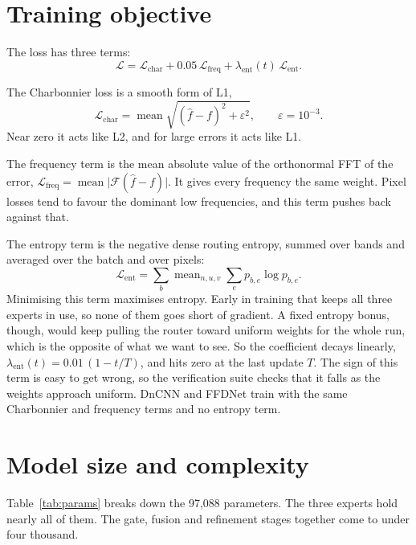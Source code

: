 \documentclass[12pt,a4paper,oneside]{NITR}
\begin{document}
\section{Training objective}\label{sec:loss}

The loss has three terms:
\begin{equation}
	\mathcal{L} = \mathcal{L}_\text{char}
	+ 0.05\,\mathcal{L}_\text{freq}
	+ \lambda_\text{ent}(t)\,\mathcal{L}_\text{ent}.
	\label{eq:loss}
\end{equation}

The Charbonnier loss \cite{charbonnier1994} is a smooth form of L1,
\begin{equation}
	\mathcal{L}_\text{char} = \operatorname{mean}\sqrt{(\hat f - f)^2 + \varepsilon^2},
	\qquad \varepsilon = 10^{-3}.
\end{equation}
Near zero it acts like L2, and for large errors it acts like L1.

The frequency term is the mean absolute value of the orthonormal FFT of the
error, $\mathcal{L}_\text{freq} = \operatorname{mean}\lvert
\mathcal{F}(\hat f - f)\rvert$. It gives every frequency the same weight.
Pixel losses tend to favour the dominant low frequencies, and this term
pushes back against that.

The entropy term is the negative dense routing entropy, summed over bands and
averaged over the batch and over pixels:
\begin{equation}
	\mathcal{L}_\text{ent} = \sum_b \operatorname{mean}_{n,u,v}\sum_e p_{b,e}\log p_{b,e}.
\end{equation}
Minimising this term maximises entropy. Early in training that keeps all
three experts in use, so none of them goes short of gradient. A fixed entropy
bonus, though, would keep pulling the router toward uniform weights for the
whole run, which is the opposite of what we want to see. So the coefficient
decays linearly, $\lambda_\text{ent}(t) = 0.01\,(1 - t/T)$, and hits zero at
the last update $T$. The sign of this term is easy to get wrong, so the
verification suite checks that it falls as the weights approach uniform.
DnCNN and FFDNet train with the same Charbonnier and frequency terms and no
entropy term.

\section{Model size and complexity}\label{sec:size}

Table~\ref{tab:params} breaks down the 97,088 parameters. The three experts
hold nearly all of them. The gate, fusion and refinement stages together come
to under four thousand.
\end{document}
